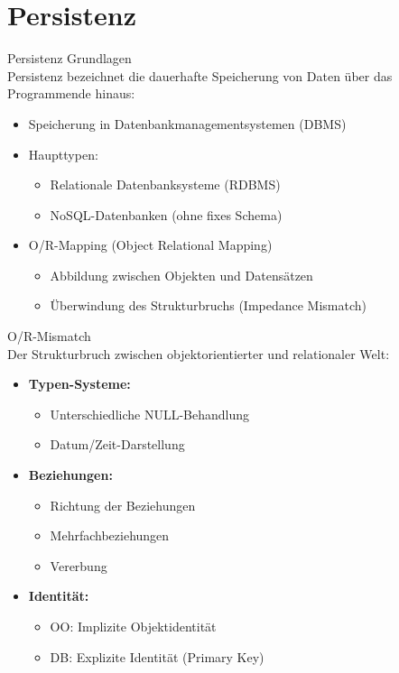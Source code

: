 \section{Persistenz}

\begin{concept}{Persistenz Grundlagen}\\
Persistenz bezeichnet die dauerhafte Speicherung von Daten über das Programmende hinaus:
\begin{itemize}
    \item Speicherung in Datenbankmanagementsystemen (DBMS)
    \item Haupttypen:
    \begin{itemize}
        \item Relationale Datenbanksysteme (RDBMS)
        \item NoSQL-Datenbanken (ohne fixes Schema)
    \end{itemize}
    \item O/R-Mapping (Object Relational Mapping)
    \begin{itemize}
        \item Abbildung zwischen Objekten und Datensätzen
        \item Überwindung des Strukturbruchs (Impedance Mismatch)
    \end{itemize}
\end{itemize}
\end{concept}

\begin{definition}{O/R-Mismatch}\\
Der Strukturbruch zwischen objektorientierter und relationaler Welt:
\begin{itemize}
    \item \textbf{Typen-Systeme:}
    \begin{itemize}
        \item Unterschiedliche NULL-Behandlung
        \item Datum/Zeit-Darstellung
    \end{itemize}
    \item \textbf{Beziehungen:}
    \begin{itemize}
        \item Richtung der Beziehungen
        \item Mehrfachbeziehungen
        \item Vererbung
    \end{itemize}
    \item \textbf{Identität:}
    \begin{itemize}
        \item OO: Implizite Objektidentität
        \item DB: Explizite Identität (Primary Key)
    \end{itemize}
\end{itemize}
\end{definition}

